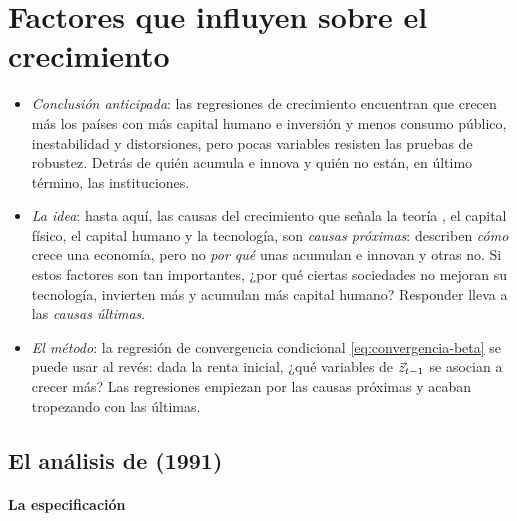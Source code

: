 \documentclass[11pt]{article}
\begin{document}
\section{Factores que influyen sobre el crecimiento}\label{sec:factores}

\begin{itemize}
\item \emph{Conclusión anticipada}: las regresiones de crecimiento encuentran que crecen más los países con más capital humano e inversión y menos consumo público, inestabilidad y distorsiones, pero pocas variables resisten las pruebas de robustez. Detrás de quién acumula e innova y quién no están, en último término, las instituciones.
\item \emph{La idea}: hasta aquí, las causas del crecimiento que señala la teoría  , el capital físico, el capital humano y la tecnología, son \emph{causas próximas}: describen \emph{cómo} crece una economía, pero no \emph{por qué} unas acumulan e innovan y otras no. Si estos factores son tan importantes, ¿por qué ciertas sociedades no mejoran su tecnología, invierten más y acumulan más capital humano? Responder lleva a las \emph{causas últimas}.
\item \emph{El método}: la regresión de convergencia condicional \eqref{eq:convergencia-beta} se puede usar al revés: dada la renta inicial, ¿qué variables de $\vec{z}_{t-1}$ se asocian a crecer más? Las regresiones empiezan por las causas próximas y acaban tropezando con las últimas.
\end{itemize}

\subsection{El análisis de  (1991)}\label{sec:barro}

\paragraph{La especificación}
\end{document}
